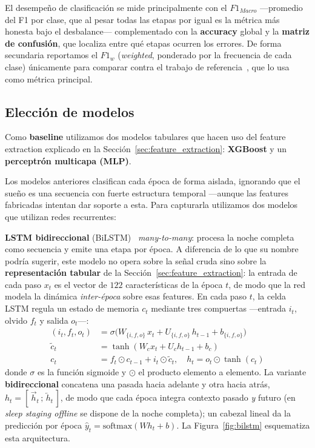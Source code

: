 \documentclass[conference]{IEEEtran}
\begin{document}
El desempeño de clasificación se mide principalmente con el \textbf{$F1_{Macro}$} ---promedio del F1 por clase, que al pesar todas las etapas por igual es la métrica más honesta bajo el desbalance--- complementado con la \textbf{accuracy} global y la \textbf{matriz de confusión}, que localiza entre qué etapas ocurren los errores. De forma secundaria reportamos el \textbf{$F1_{w}$} (\emph{weighted}, ponderado por la frecuencia de cada clase) únicamente para comparar contra el trabajo de referencia~\cite{slamss-ifs}, que lo usa como métrica principal.

\subsection{Elección de modelos}

Como \textbf{baseline} utilizamos dos modelos tabulares que hacen uso del feature extraction explicado en la Sección~\ref{sec:feature_extraction}: \textbf{XGBoost} y un \textbf{perceptrón multicapa (MLP)}.

Los modelos anteriores clasifican cada época de forma aislada, ignorando que el sueño es una secuencia con fuerte estructura temporal ---aunque las features fabricadas intentan dar soporte a esta. Para capturarla utilizamos dos modelos que utilizan redes recurrentes: 

\textbf{LSTM bidireccional} (BiLSTM)~\cite{hochreiter1997lstm,schuster1997bilstm} \emph{many-to-many}: procesa la noche completa como secuencia y emite una etapa por época. A diferencia de lo que su nombre podría sugerir, este modelo no opera sobre la señal cruda sino sobre la \textbf{representación tabular} de la Sección~\ref{sec:feature_extraction}: la entrada de cada paso $x_t$ es el vector de $122$ características de la época $t$, de modo que la red modela la dinámica \emph{inter-época} sobre esas features. En cada paso $t$, la celda LSTM regula un estado de memoria $c_t$ mediante tres compuertas ---entrada $i_t$, olvido $f_t$ y salida $o_t$---:
\begin{equation}
\begin{aligned}
(i_t, f_t, o_t) &= \sigma\!\big(W_{\{i,f,o\}}\, x_t + U_{\{i,f,o\}}\, h_{t-1} + b_{\{i,f,o\}}\big)\\
\tilde{c}_t &= \tanh(W_c x_t + U_c h_{t-1} + b_c)\\
c_t &= f_t \odot c_{t-1} + i_t \odot \tilde{c}_t, \quad h_t = o_t \odot \tanh(c_t)
\end{aligned}
\label{eq:lstm}
\end{equation}
donde $\sigma$ es la función sigmoide y $\odot$ el producto elemento a elemento. La variante \textbf{bidireccional} concatena una pasada hacia adelante y otra hacia atrás, $h_t = [\,\overrightarrow{h}_t \,;\, \overleftarrow{h}_t\,]$, de modo que cada época integra contexto pasado \emph{y} futuro (en \emph{sleep staging offline} se dispone de la noche completa); un cabezal lineal da la predicción por época $\hat{y}_t = \mathrm{softmax}(W h_t + b)$. La Figura~\ref{fig:bilstm} esquematiza esta arquitectura.
\end{document}
